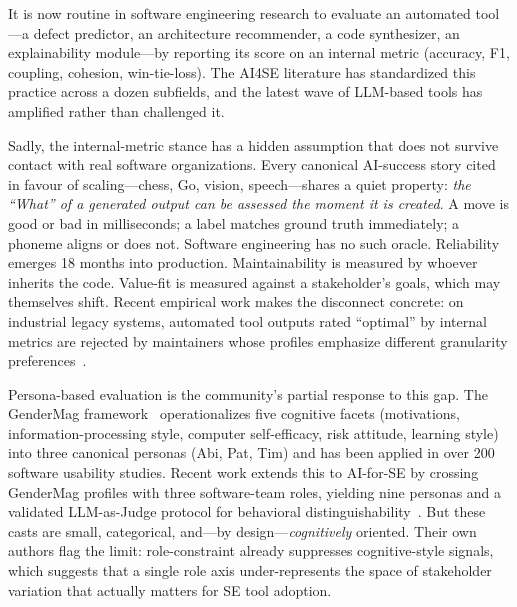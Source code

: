 \documentclass[10pt,conference]{IEEEtran}
\begin{document}
It is now routine in software engineering research to evaluate an automated
tool---a defect predictor, an architecture recommender, a code synthesizer,
an explainability module---by reporting its score on an internal metric
(accuracy, F1, coupling, cohesion, win-tie-loss). The AI4SE literature has
standardized this practice across a dozen subfields, and the latest wave of
LLM-based tools has amplified rather than challenged it.

Sadly, the internal-metric stance has a hidden assumption that does not
survive contact with real software organizations. Every canonical
AI-success story cited in favour of scaling---chess, Go, vision,
speech---shares a quiet property: \emph{the ``What'' of a generated output
can be assessed the moment it is created}. A move is good or bad in
milliseconds; a label matches ground truth immediately; a phoneme aligns or
does not. Software engineering has no such oracle. Reliability emerges 18
months into production. Maintainability is measured by whoever inherits the
code. Value-fit is measured against a stakeholder's goals, which may
themselves shift. Recent empirical work makes the disconnect concrete: on
industrial legacy systems, automated tool outputs rated ``optimal'' by
internal metrics are rejected by maintainers whose profiles emphasize
different granularity preferences~\cite{carvalho2024usefulness}.

Persona-based evaluation is the community's partial response to this gap.
The GenderMag framework~\cite{burnett2016gendermag} operationalizes five
cognitive facets (motivations, information-processing style, computer
self-efficacy, risk attitude, learning style) into three canonical personas
(Abi, Pat, Tim) and has been applied in over 200 software usability studies.
Recent work extends this to AI-for-SE by crossing GenderMag profiles with
three software-team roles, yielding nine personas and a validated LLM-as-Judge
protocol for behavioral distinguishability~\cite{estes2026se4ai}. But these
casts are small, categorical, and---by design---\emph{cognitively} oriented.
Their own authors flag the limit: role-constraint already suppresses
cognitive-style signals, which suggests that a single role axis
under-represents the space of stakeholder variation that actually matters for
SE tool adoption.
\end{document}
